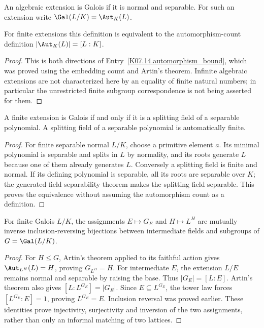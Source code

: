 \begin{definition}
An algebraic extension is Galois if it is normal and separable. For such an extension write $\Gal(L/K)=\Aut_K(L)$.
\end{definition}
\begin{proposition}
For finite extensions this definition is equivalent to the automorphism-count definition $|\Aut_K(L)|=[L:K]$.
\end{proposition}
\begin{proof}
This is both directions of Entry~\ref{K07.14.automorphism_bound}, which was proved using the embedding count and Artin's theorem. Infinite algebraic extensions are not characterized here by an equality of finite natural numbers; in particular the unrestricted finite subgroup correspondence is not being asserted for them.
\end{proof}

\begin{theorem}
A finite extension is Galois if and only if it is a splitting field of a separable polynomial. A splitting field of a separable polynomial is automatically finite.
\end{theorem}
\begin{proof}
For finite separable normal $L/K$, choose a primitive element $a$. Its minimal polynomial is separable and splits in $L$ by normality, and its roots generate $L$ because one of them already generates $L$. Conversely a splitting field is finite and normal. If its defining polynomial is separable, all its roots are separable over $K$; the generated-field separability theorem makes the splitting field separable. This proves the equivalence without assuming the automorphism count as a definition.
\end{proof}

\begin{theorem}
For finite Galois $L/K$, the assignments $E\mapsto G_E$ and $H\mapsto L^H$ are mutually inverse inclusion-reversing bijections between intermediate fields and subgroups of $G=\Gal(L/K)$.
\end{theorem}
\begin{proof}
For $H\leq G$, Artin's theorem applied to its faithful action gives $\Aut_{L^H}(L)=H$, proving $G_{L^H}=H$. For intermediate $E$, the extension $L/E$ remains normal and separable by raising the base. Thus $|G_E|=[L:E]$. Artin's theorem also gives $[L:L^{G_E}]=|G_E|$. Since $E\subseteq L^{G_E}$, the tower law forces $[L^{G_E}:E]=1$, proving $L^{G_E}=E$. Inclusion reversal was proved earlier. These identities prove injectivity, surjectivity and inversion of the two assignments, rather than only an informal matching of two lattices.
\end{proof}

